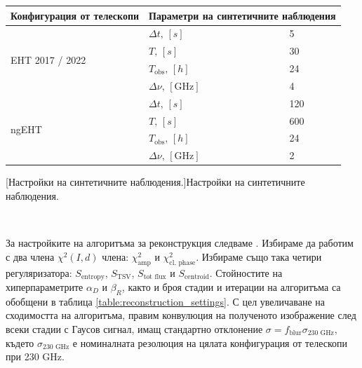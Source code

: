\begin{minipage}{18em}
	\begin{center}
		\begin{tabular}{|| m{7.5em} | m{5em} | m{2em} ||}
			\hline 
			Конфигурация от телескопи & \multicolumn{2}{m{7em}||}{Параметри на синтетичните наблюдения} \\
			\hline
			\multirow{4}{7.5em}{\centering \small EHT 2017 / 2022} &\centering $\Delta t,\, [s]$    		& 5   \\ 
														&\centering $T,\,[s]$ 		     		& 30  \\ 
														&\centering $T_\text{obs},\,[h]$ 		& 24  \\
														&\centering $\Delta \nu,\,[\text{GHz}]$ & 4 \\
			\hline
			\multirow{4}{7.5em}{\centering \small ngEHT} 		  & \centering $\Delta t,\, [s]$    	   & 120 \\ 
													  & \centering $T,\,[s]$ 		      	   & 600 \\ 
												      & \centering $T_\text{obs},\,[h]$ 	   & 24  \\
												      & \centering $\Delta \nu,\,[\text{GHz}]$ & 2 \\
			\hline
		\end{tabular}
	\end{center}
	[Настройки на синтетичните наблюдения.]{Настройки на синтетичните наблюдения.}
	\label{table:ehtim_obs_settings}
\end{minipage}\,\,
\begin{minipage}{18em}
	За настройките на алгоритъма за реконструкция следваме \cite{EHTIM}. Избираме да работим с два члена $\chi^2(I,d)$ члена: $\chi^2_\text{amp}$ и $\chi^2_\text{cl. phase}$. Избираме също така четири регуляризатора: $S_\text{entropy}$, $S_\text{TSV}$, $S_\text{tot flux}$ и $S_\text{centroid}$. Стойностите на хиперпараметрите $\alpha_D$ и $\beta_R$, както и броя стадии и итерации на алгоритъма са обобщени в таблица \ref{table:reconstruction_settings}. С цел увеличаване на сходимостта на алгоритъма, правим конвулюция на полученото изображение след всеки стадии с Гаусов сигнал, имащ стандартно отклонение $\sigma = f_\text{blur} \sigma_{\text{230 GHz}}$, където $\sigma_{\text{230 GHz}}$ е номиналната резолюция на цялата конфигурация от телескопи при 230 GHz.
\end{minipage}

